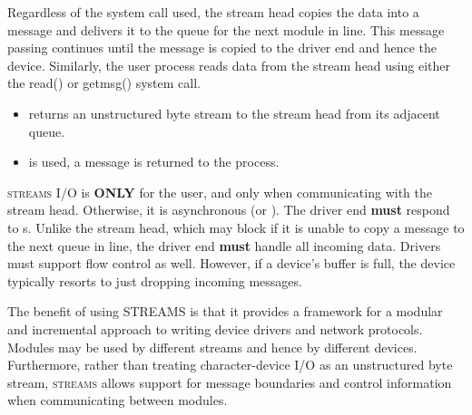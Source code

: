 Regardless of the system call used, the stream head copies the data into a message and delivers it to the queue for the next module in line.
This message passing continues until the message is copied to the driver end and hence the device.
Similarly, the user process reads data from the stream head using either the read() or getmsg() system call.
\begin{itemize}[noitemsep]
\item {} returns an unstructured byte stream to the stream head from its adjacent queue.
\item {} is used, a message is returned to the process.
\end{itemize}

\textsc{streams} I/O is  \textbf{ONLY} for the user, and only when communicating with the stream head.
Otherwise, it is asynchronous (or ).
The driver end \textbf{must} respond to s.
Unlike the stream head, which may block if it is unable to copy a message to the next queue in line, the driver end \textbf{must} handle all incoming data.
Drivers must support flow control as well.
However, if a device’s buffer is full, the device typically resorts to just dropping incoming messages.

The benefit of using STREAMS is that it provides a framework for a modular and incremental approach to writing device drivers and network protocols.
Modules may be used by different streams and hence by different devices.
Furthermore, rather than treating character-device I/O as an unstructured byte stream, \textsc{streams} allows support for message boundaries and control information when communicating between modules.

